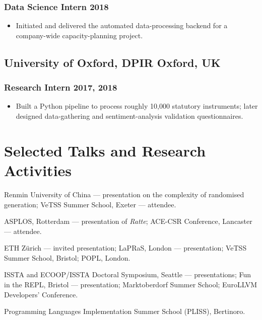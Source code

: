 \documentclass[11pt]{article}
\newcommand{\rside}[1]{\hfill {\normalfont\color{accent} #1}}
\begin{document}
\subsubsection{Data Science Intern \rside{2018}}
\begin{itemize}
  \item Initiated and delivered the automated data-processing backend for a company-wide capacity-planning project.
\end{itemize}

\subsection{University of Oxford, DPIR \rside{Oxford, UK}}
\subsubsection{Research Intern \rside{2017, 2018}}
\begin{itemize}
  \item Built a Python pipeline to process roughly 10,000 statutory instruments; later designed data-gathering and sentiment-analysis validation questionnaires.
\end{itemize}

\section{Selected Talks and Research Activities}

\begin{description}[style=multiline,leftmargin=4.8em]
  \item[2026] Renmin University of China --- presentation on the complexity of randomised generation; VeTSS Summer School, Exeter --- attendee.
  \item[2025] ASPLOS, Rotterdam --- presentation of \textit{Ratte}; ACE-CSR Conference, Lancaster --- attendee.
  \item[2024] ETH Z\"urich --- invited presentation; LaPRaS, London --- presentation; VeTSS Summer School, Bristol; POPL, London.
  \item[2023] ISSTA and ECOOP/ISSTA Doctoral Symposium, Seattle --- presentations; Fun in the REPL, Bristol --- presentation; Marktoberdorf Summer School; EuroLLVM Developers' Conference.
  \item[2022] Programming Languages Implementation Summer School (PLISS), Bertinoro.
\end{description}
\end{document}
